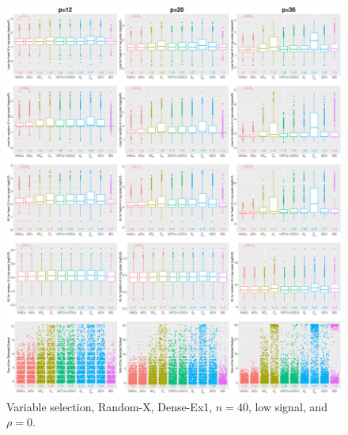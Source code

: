 \begin{figure}[!ht]
\centering
\includegraphics[width=\textwidth]{figures/supplement/randomx/subset_selection/Dense-Ex1_n40_lsnr_rho0.eps}
\caption{Variable selection, Random-X, Dense-Ex1, $n=40$, low signal, and $\rho=0$.}
\end{figure}
\clearpage
